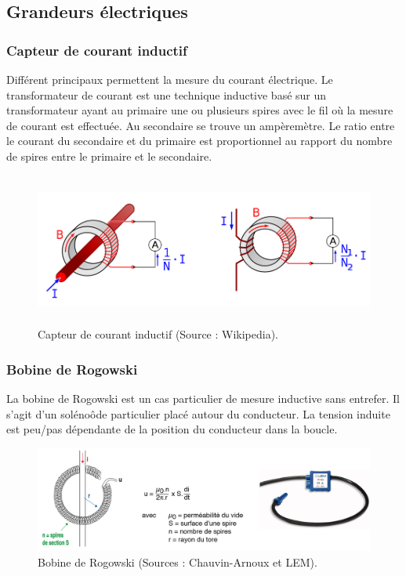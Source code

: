 \subsection{Grandeurs électriques}

\subsubsection{Capteur de courant inductif}

Différent principaux permettent la mesure du courant électrique. Le transformateur de courant est une technique inductive basé sur un transformateur ayant au primaire une ou plusieurs spires avec le fil où la mesure de courant est effectuée. Au secondaire se trouve un ampèremètre. Le ratio entre le courant du secondaire et du primaire est proportionnel au rapport du nombre de spires entre le primaire et le secondaire.
\begin{figure}[h!]
\centering
\includegraphics[height=5cm]{assets/figures/4_2_1_1_Capteur_de_courant_inductif.PNG}
\caption{Capteur de courant inductif (Source : Wikipedia).}
\label{fig:Capteur_de_courant_inductif}
\end{figure}

\subsubsection{Bobine de Rogowski}

La bobine de Rogowski est un cas particulier de mesure inductive sans entrefer. Il s'agit d'un solénoôde particulier placé autour du conducteur. La tension induite est peu/pas dépendante de la position du conducteur dans la boucle.

\begin{figure}[h!]
\centering
\includegraphics[width=15cm]{assets/figures/4_2_1_2_Bobine_de_Rogowski.PNG}
\caption{Bobine de Rogowski (Sources : Chauvin-Arnoux et LEM).}
\label{fig:Bobine_de_Rogowski}
\end{figure}


